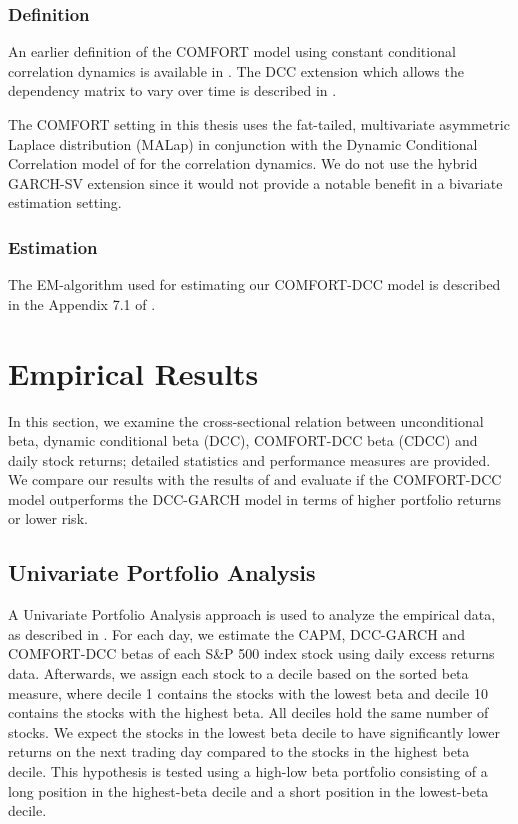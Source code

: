 \documentclass[11pt,a4paper]{article}
\def \indexName {S\&P 500}
\begin{document}
\subsubsection{Definition}

An earlier definition of the COMFORT model using constant conditional correlation dynamics is available in . The DCC extension which allows the dependency matrix to vary over time is described in .

The COMFORT setting in this thesis uses the fat-tailed, multivariate asymmetric Laplace distribution (MALap) in conjunction with the Dynamic Conditional Correlation model of  for the correlation dynamics. We do not use the hybrid GARCH-SV extension since it would not provide a notable benefit in a bivariate estimation setting.



\subsubsection{Estimation}

The EM-algorithm used for estimating our COMFORT-DCC model is described in the Appendix 7.1 of .








\newpage
\section{Empirical Results}

In this section, we examine the cross-sectional relation between unconditional beta, dynamic conditional beta (DCC), COMFORT-DCC beta (CDCC) and daily stock returns; detailed statistics and performance measures are provided. We compare our results with the results of  and evaluate if the COMFORT-DCC model outperforms the DCC-GARCH model in terms of higher portfolio returns or lower risk.



\subsection{Univariate Portfolio Analysis}

A Univariate Portfolio Analysis approach is used to analyze the empirical data, as described in . For each day, we estimate the CAPM, DCC-GARCH and COMFORT-DCC betas of each \indexName{} index stock using daily excess returns data. Afterwards, we assign each stock to a decile based on the sorted beta measure, where decile 1 contains the stocks with the lowest beta and decile 10 contains the stocks with the highest beta. All deciles hold the same number of stocks. We expect the stocks in the lowest beta decile to have significantly lower returns on the next trading day compared to the stocks in the highest beta decile. This hypothesis is tested using a high-low beta portfolio consisting of a long position in the highest-beta decile and a short position in the lowest-beta decile. 
\end{document}
